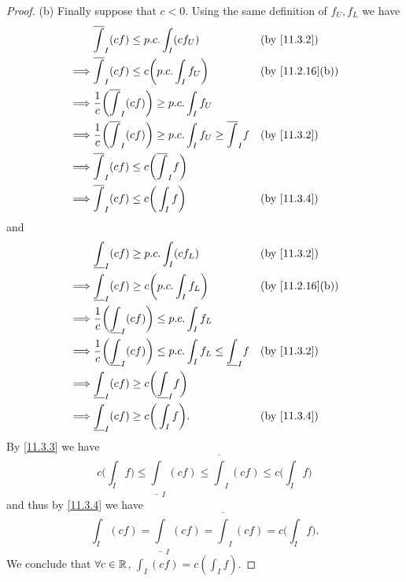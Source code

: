 \begin{proof}{(b)}
  Finally suppose that \(c < 0\).
  Using the same definition of \(f_U, f_L\) we have
  \begin{align*}
             & \overline{\int}_I (cf) \leq p.c. \int_I (c f_U)                                               &  & \by{11.3.2}     \\
    \implies & \overline{\int}_I (cf) \leq c \bigg(p.c. \int_I f_U\bigg)                                     &  & \by{11.2.16}[b] \\
    \implies & \dfrac{1}{c} \bigg(\overline{\int}_I (cf)\bigg) \geq p.c. \int_I f_U                                               \\
    \implies & \dfrac{1}{c} \bigg(\overline{\int}_I (cf)\bigg) \geq p.c. \int_I f_U \geq \overline{\int}_I f &  & \by{11.3.2}     \\
    \implies & \overline{\int}_I (cf) \leq c\bigg(\overline{\int}_I f\bigg)                                                       \\
    \implies & \overline{\int}_I (cf) \leq c\bigg(\int_I f\bigg)                                             &  & \by{11.3.4}
  \end{align*}
  and
  \begin{align*}
             & \underline{\int}_I (cf) \geq p.c. \int_I (c f_L)                                                &  & \by{11.3.2}     \\
    \implies & \underline{\int}_I (cf) \geq c \bigg(p.c. \int_I f_L\bigg)                                      &  & \by{11.2.16}[b] \\
    \implies & \dfrac{1}{c} \bigg(\underline{\int}_I (cf)\bigg) \leq p.c. \int_I f_L                                                \\
    \implies & \dfrac{1}{c} \bigg(\underline{\int}_I (cf)\bigg) \leq p.c. \int_I f_L \leq \underline{\int}_I f &  & \by{11.3.2}     \\
    \implies & \underline{\int}_I (cf) \geq c\bigg(\underline{\int}_I f\bigg)                                                       \\
    \implies & \underline{\int}_I (cf) \geq c\bigg(\int_I f\bigg).                                             &  & \by{11.3.4}
  \end{align*}
  By \cref{11.3.3} we have
  \[
    c\bigg(\int_I f\bigg) \leq \underline{\int}_I (cf) \leq \overline{\int}_I (cf) \leq c\bigg(\int_I f\bigg)
  \]
  and thus by \cref{11.3.4} we have
  \[
    \int_I (cf) = \underline{\int}_I (cf) = \overline{\int}_I (cf) = c\bigg(\int_I f\bigg).
  \]
  We conclude that \(\forall c \in \mathbb{R}\), \(\int_I (cf) = c (\int_I f)\).
\end{proof}

